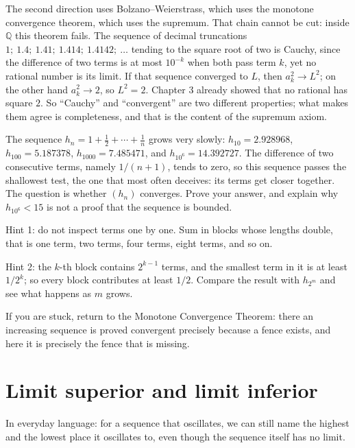 The second direction uses Bolzano--Weierstrass, which uses the monotone convergence
theorem, which uses the supremum. That chain cannot be cut: inside $\mathbb{Q}$ this
theorem fails. The sequence of decimal truncations
$1;\ 1.4;\ 1.41;\ 1.414;\ 1.4142;\ \dots$ tending to the square root of two is Cauchy,
since the difference of two terms is at most $10^{-k}$ when both pass term $k$, yet no
rational number is its limit. If that sequence converged to $L$, then $a_k^2 \to L^2$;
on the other hand $a_k^2 \to 2$, so $L^2=2$. Chapter 3 already showed that no rational
has square $2$. So ``Cauchy'' and ``convergent'' are two different properties; what
makes them agree is completeness, and that is the content of the supremum axiom.

\begin{tantangan}
The sequence $h_n=1+\frac12+\cdots+\frac1n$ grows very slowly: $h_{10}=2.928968$,
$h_{100}=5.187378$, $h_{1000}=7.485471$, and $h_{10^6}=14.392727$. The difference of
two consecutive terms, namely $1/(n+1)$, tends to zero, so this sequence passes the
shallowest test, the one that most often deceives: its terms get closer together. The
question is whether $(h_n)$ converges. Prove your answer, and explain why
$h_{10^6}<15$ is not a proof that the sequence is bounded.

Hint 1: do not inspect terms one by one. Sum in blocks whose lengths double, that is
one term, two terms, four terms, eight terms, and so on.

Hint 2: the $k$-th block contains $2^{k-1}$ terms, and the smallest term in it is at
least $1/2^k$; so every block contributes at least $1/2$. Compare the result with
$h_{2^m}$ and see what happens as $m$ grows.

If you are stuck, return to the Monotone Convergence Theorem: there an increasing
sequence is proved convergent precisely because a fence exists, and here it is
precisely the fence that is missing.
\end{tantangan}

\section{Limit superior and limit inferior}

In everyday language: for a sequence that oscillates, we can still name the highest and
the lowest place it oscillates to, even though the sequence itself has no limit.


